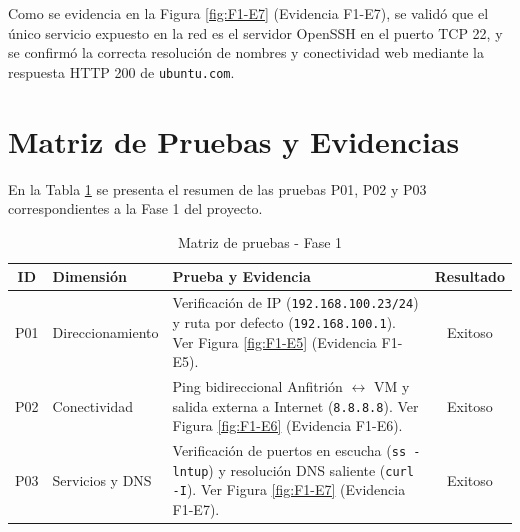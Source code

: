 \documentclass[12pt,a4paper]{article}
\begin{document}
Como se evidencia en la Figura \ref{fig:F1-E7} (Evidencia F1-E7), se validó que el único servicio expuesto en la red es el servidor OpenSSH en el puerto TCP 22, y se confirmó la correcta resolución de nombres y conectividad web mediante la respuesta HTTP 200 de \texttt{ubuntu.com}.

\section{Matriz de Pruebas y Evidencias}
En la Tabla \ref{tab:matriz_fase1} se presenta el resumen de las pruebas P01, P02 y P03 correspondientes a la Fase 1 del proyecto.

\begin{table}[h!]
\centering
\begin{tabular}{|c|p{3.5cm}|p{6.5cm}|c|}
\hline
\textbf{ID} & \textbf{Dimensión} & \textbf{Prueba y Evidencia} & \textbf{Resultado} \\ \hline
P01 & Direccionamiento & Verificación de IP (\texttt{192.168.100.23/24}) y ruta por defecto (\texttt{192.168.100.1}). Ver Figura \ref{fig:F1-E5} (Evidencia F1-E5). & Exitoso \\ \hline
P02 & Conectividad & Ping bidireccional Anfitrión $\leftrightarrow$ VM y salida externa a Internet (\texttt{8.8.8.8}). Ver Figura \ref{fig:F1-E6} (Evidencia F1-E6). & Exitoso \\ \hline
P03 & Servicios y DNS & Verificación de puertos en escucha (\texttt{ss -lntup}) y resolución DNS saliente (\texttt{curl -I}). Ver Figura \ref{fig:F1-E7} (Evidencia F1-E7). & Exitoso \\ \hline
\end{tabular}
\caption{Matriz de pruebas - Fase 1}
\label{tab:matriz_fase1}
\end{table}
\end{document}
